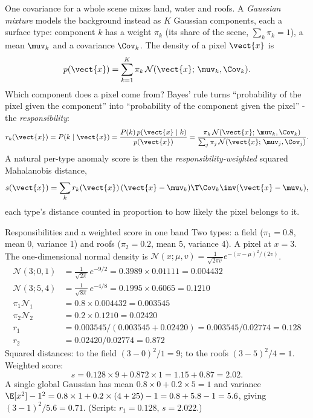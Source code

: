 One covariance for a whole scene mixes land, water and roofs. A \emph{Gaussian mixture} models the background instead as
$K$ Gaussian components, each a surface type: component $k$ has a weight $\pi_k$ (its share of the scene, $\sum_k \pi_k =
1$), a mean $\muv_k$ and a covariance $\Cov_k$. The density of a pixel $\vect{x}$ is
\begin{equation}
p(\vect{x}) = \sum_{k=1}^K \pi_k\,\mathcal{N}(\vect{x};\,\muv_k, \Cov_k). \label{eq:scoringgains:gmm}
\end{equation}
Which component does a pixel come from? Bayes' rule turns ``probability of the pixel given the component'' into
``probability of the component given the pixel'' - the \emph{responsibility}:
\begin{equation}
r_k(\vect{x}) = P(k \mid \vect{x}) = \frac{P(k)\,p(\vect{x} \mid k)}{p(\vect{x})} =
\frac{\pi_k\,\mathcal{N}(\vect{x};\,\muv_k, \Cov_k)}{\sum_j \pi_j\,\mathcal{N}(\vect{x};\,\muv_j, \Cov_j)}.
\label{eq:scoringgains:resp}
\end{equation}
A natural per-type anomaly score is then the \emph{responsibility-weighted} squared Mahalanobis distance,
\begin{equation}
s(\vect{x}) = \sum_k r_k(\vect{x})\,(\vect{x} - \muv_k)\T\Cov_k\inv(\vect{x} - \muv_k), \label{eq:scoringgains:rwm}
\end{equation}
each type's distance counted in proportion to how likely the pixel belongs to it.

\begin{worked}[label={we:scoringgains:gmm}]{Responsibilities and a weighted score in one band}
Two types: a field ($\pi_1 = 0.8$, mean 0, variance 1) and roofs ($\pi_2 = 0.2$, mean 5, variance 4). A pixel at $x = 3$.
The one-dimensional normal density is $\mathcal{N}(x; \mu, v) = \frac{1}{\sqrt{2\pi v}} e^{-(x - \mu)^2 / (2v)}$.
\begin{align*}
\mathcal{N}(3; 0, 1) &= \tfrac{1}{\sqrt{2\pi}}\,e^{-9/2} = 0.3989 \times 0.01111 = 0.004432\\
\mathcal{N}(3; 5, 4) &= \tfrac{1}{\sqrt{8\pi}}\,e^{-4/8} = 0.1995 \times 0.6065 = 0.1210\\
\pi_1 \mathcal{N}_1 &= 0.8 \times 0.004432 = 0.003545\\
\pi_2 \mathcal{N}_2 &= 0.2 \times 0.1210 = 0.02420\\
r_1 &= 0.003545 / (0.003545 + 0.02420) = 0.003545 / 0.02774 = 0.128\\
r_2 &= 0.02420 / 0.02774 = 0.872
\end{align*}
Squared distances: to the field $(3 - 0)^2 / 1 = 9$; to the roofs $(3 - 5)^2 / 4 = 1$. Weighted score:
\[
s = 0.128 \times 9 + 0.872 \times 1 = 1.15 + 0.87 = 2.02 .
\]
A single global Gaussian has mean $0.8 \times 0 + 0.2 \times 5 = 1$ and variance $\E[x^2] - 1^2 = 0.8 \times 1 + 0.2 \times
(4 + 25) - 1 = 0.8 + 5.8 - 1 = 5.6$, giving $(3 - 1)^2 / 5.6 = 0.71$. (Script: $r_1 = 0.128$, $s = 2.022$\tagC.)
\end{worked}

